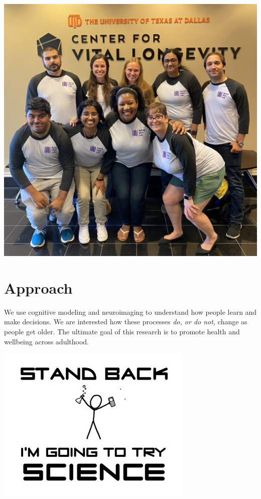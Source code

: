 \documentclass[
]{book}
\begin{document}
\includegraphics[width=1\textwidth,height=\textheight]{images/Lab_photo_Summer2021.jpg}

\hypertarget{approach}{%
\chapter{Approach}\label{approach}}

We use cognitive modeling and neuroimaging to understand how people learn and make decisions. We are interested how these processes \emph{do, or do not,} change as people get older. The ultimate goal of this research is to promote health and wellbeing across adulthood.

\includegraphics{images/xkcd_science.png}
\end{document}
